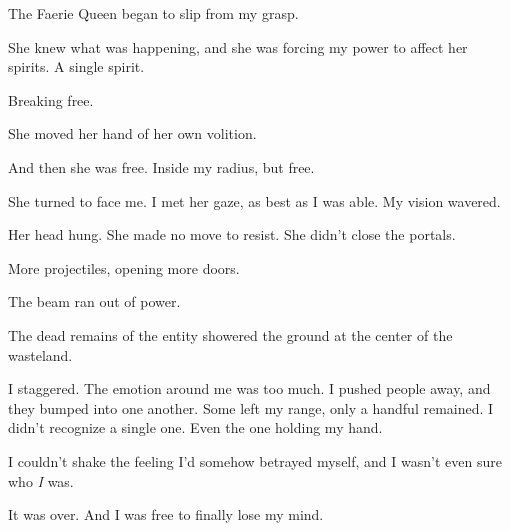 The Faerie Queen began to slip from my grasp.



She knew what was happening, and she was forcing my power to affect her spirits.  A single spirit.



Breaking free.



She moved her hand of her own volition.



And then she was free.  Inside my radius, but free.



She turned to face me.  I met her gaze, as best as I was able.  My vision wavered.



Her head hung.  She made no move to resist.  She didn't close the portals.



More projectiles, opening more doors.



The beam ran out of power.



The dead remains of the entity showered the ground at the center of the wasteland.



I staggered.  The emotion around me was too much.  I pushed people away, and they bumped into one another.  Some left my range, only a handful remained.  I didn't recognize a single one.  Even the one holding my hand.



I couldn't shake the feeling I'd somehow betrayed myself, and I wasn't even sure who \emph{I} was.



It was over.  And I was free to finally lose my mind.





